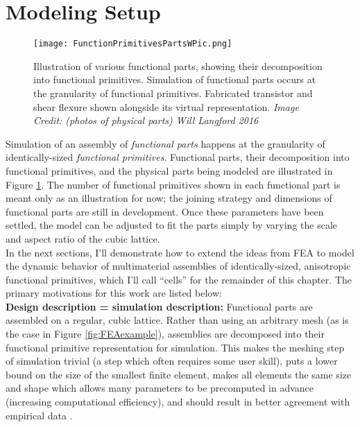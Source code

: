 {\section{Modeling Setup}

\begin{figure}
  \texttt{[image: FunctionPrimitivesPartsWPic.png]}
  \caption{Illustration of various functional parts, showing their decomposition into functional primitives.  Simulation of functional parts occurs at the granularity of functional primitives.  Fabricated transistor and shear flexure shown alongside its virtual representation.  \textit{Image Credit: (photos of physical parts) Will Langford 2016}}
  \label{fig:FunctionPrimitivesPartsWPic}
\end{figure}

Simulation of an assembly of \textit{functional parts} happens at the granularity of identically-sized \textit{functional primitives}.  Functional parts, their decomposition into functional primitives, and the physical parts being modeled are illustrated in Figure \ref{fig:FunctionPrimitivesPartsWPic}.  The number of functional primitives shown in each functional part is meant only as an illustration for now; the joining strategy and dimensions of functional parts are still in development.  Once these parameters have been settled, the model can be adjusted to fit the parts simply by varying the scale and aspect ratio of the cubic lattice.\\

In the next sections, I'll demonstrate how to extend the ideas from FEA to model the dynamic behavior of multimaterial assemblies of identically-sized, anisotropic functional primitives, which I'll call ``cells'' for the remainder of this chapter.  The primary motivations for this work are listed below:\\

\textbf{Design description = simulation description:} Functional parts are assembled on a regular, cubic lattice.  Rather than using an arbitrary mesh (as is the case in Figure \ref{fig:FEAexample}), assemblies are decomposed into their functional primitive representation for simulation.  This makes the meshing step of simulation trivial (a step which often requires some user skill), puts a lower bound on the size of the smallest finite element, makes all elements the same size and shape which allows many parameters to be precomputed in advance (increasing computational efficiency), and should result in better agreement with empirical data \cite{Calisch2014}.\\

}
